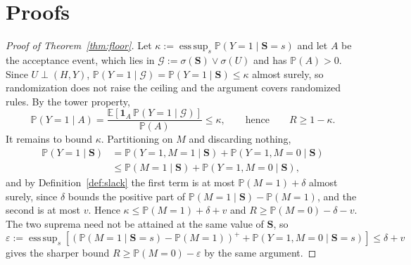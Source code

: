 \documentclass{article}
\newif\ifredflags
\newcommand{\rf}[1]{\ifredflags{\textcolor{red}{\textbf{[MISSING: #1]}}}\fi}
\newcommand{\esssup}{\operatorname*{ess\,sup}}
\newcommand{\gate}{\mathbf{S}}
\begin{document}



\newpage
\appendix

\section{Proofs}
\label{app:proofs}

\noindent\rf{human verification of the two proofs below. They were drafted with AI assistance. A
machine harness checks the bound numerically against randomly drawn joint distributions and finds no
violation, but a numerical check is not a derivation. An author must re-derive both by hand, after
which this flag and the corresponding sentence in Appendix~\ref{app:ai} are removed. \emph{The paper
must not be submitted with this flag present.}}

\begin{proof}[Proof of Theorem~\ref{thm:floor}]
Let $\kappa:=\esssup_s\mathbb{P}(Y=1\mid\gate=s)$ and let $A$ be the acceptance event, which lies in
$\mathcal{G}:=\sigma(\gate)\vee\sigma(U)$ and has $\mathbb{P}(A)>0$. Since $U\perp(H,Y)$,
$\mathbb{P}(Y=1\mid\mathcal{G})=\mathbb{P}(Y=1\mid\gate)\le\kappa$ almost surely, so randomization
does not raise the ceiling and the argument covers randomized rules. By the tower property,
\[
\mathbb{P}(Y=1\mid A)=\frac{\mathbb{E}[\mathbf{1}_A\,\mathbb{P}(Y=1\mid\mathcal{G})]}{\mathbb{P}(A)}
\le\kappa ,
\qquad\text{hence}\qquad R\ge1-\kappa .
\]
It remains to bound $\kappa$. Partitioning on $M$ and discarding nothing,
\begin{align*}
\mathbb{P}(Y=1\mid\gate)&=\mathbb{P}(Y=1,M=1\mid\gate)+\mathbb{P}(Y=1,M=0\mid\gate)\\
&\le\mathbb{P}(M=1\mid\gate)+\mathbb{P}(Y=1,M=0\mid\gate),
\end{align*}
and by Definition~\ref{def:slack} the first term is at most $\mathbb{P}(M=1)+\delta$ almost surely,
since $\delta$ bounds the positive part of $\mathbb{P}(M=1\mid\gate)-\mathbb{P}(M=1)$, and the second
is at most $v$. Hence $\kappa\le\mathbb{P}(M=1)+\delta+v$ and $R\ge\mathbb{P}(M=0)-\delta-v$. The two
suprema need not be attained at the same value of $\gate$, so
$\varepsilon:=\esssup_s[(\mathbb{P}(M=1\mid\gate=s)-\mathbb{P}(M=1))^{+}+\mathbb{P}(Y=1,M=0\mid\gate=s)]
\le\delta+v$ gives the sharper bound $R\ge\mathbb{P}(M=0)-\varepsilon$ by the same argument.
\end{proof}
\end{document}

